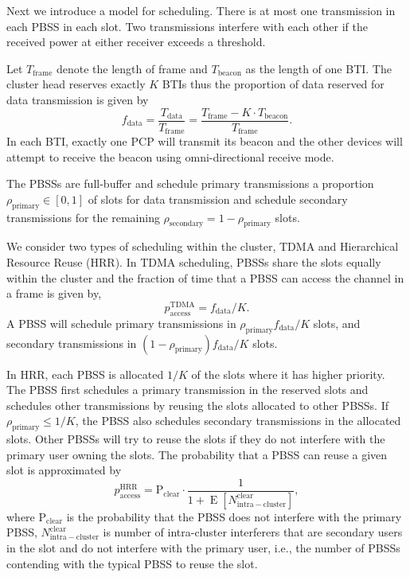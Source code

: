\documentclass[10pt, conference, letterpaper]{IEEEtran}
\DeclareMathOperator*{\E}{\mathrm{E}}
\begin{document}
Next we introduce a model for scheduling.
There is at most one transmission in each PBSS in each slot. 
Two transmissions interfere with each other if the received power at either receiver exceeds a threshold.

Let $T_{\mathrm{frame}}$ denote the length of frame and $T_{\mathrm{beacon}}$ as the length of one BTI. 
The cluster head reserves exactly $K$ BTIs thus the proportion of data reserved for data transmission is given by
\begin{equation*}
f_{\mathrm{data}} = \frac{T_{\mathrm{data}}}{T_{\mathrm{frame}}} = \frac{T_{\mathrm{frame}} - K\cdot T_{\mathrm{beacon}}} {T_{\mathrm{frame}}}.
\end{equation*}
In each BTI, exactly one PCP will transmit its beacon and the other devices will attempt to receive the beacon using omni-directional receive mode. 

The PBSSs are full-buffer and schedule primary transmissions a proportion $\rho_{\mathrm{primary}}\in[0,1]$ of slots for data transmission and schedule secondary transmissions for the remaining $\rho_{\mathrm{secondary}} =1 - \rho_{\mathrm{primary}}$  slots. 

We consider two types of scheduling within the cluster, TDMA and Hierarchical Resource Reuse (HRR). In TDMA scheduling, PBSSs share the slots equally within the cluster and the fraction of time that a PBSS can access the channel in a frame is given by, 
\begin{equation*}
p_{\mathrm{access}}^{\mathrm{TDMA}} = f_{\mathrm{data}}/K.
\end{equation*}
A PBSS will schedule primary transmissions in $\rho_{\mathrm{primary}}f_{\mathrm{data}}/K$ slots, and secondary transmissions in $(1-\rho_{\mathrm{primary}})f_{\mathrm{data}}/K$ slots. 

In HRR, each PBSS is allocated $1/K$ of the slots where it has higher priority. 
The PBSS first schedules a primary transmission in the reserved slots and schedules other transmissions by reusing the slots allocated to other PBSSs. 
If $\rho_{\mathrm{primary}}\leq 1/K$, the PBSS also schedules secondary transmissions in the allocated slots. 
Other PBSSs will try to reuse the slots if they do not interfere with the primary user owning the slots.
The probability that a PBSS can reuse a given slot is approximated by
\begin{equation*}
p_{\mathrm{access}}^{\mathrm{HRR}}=\mathrm{P}_{\mathrm{clear}}\cdot \frac{1}{1+\E[N_{\mathrm{intra-cluster}}^{\mathrm{clear}}]},
\end{equation*}
where $\mathrm{P}_{\mathrm{clear}}$ is the probability that the PBSS does not interfere with the primary PBSS, 
$N_{\mathrm{intra-cluster}}^{\mathrm{clear}}$ is number of intra-cluster interferers that are secondary users in the slot and do not interfere with the primary user, i.e., the number of PBSSs contending with the typical PBSS to reuse the slot.
\end{document}
